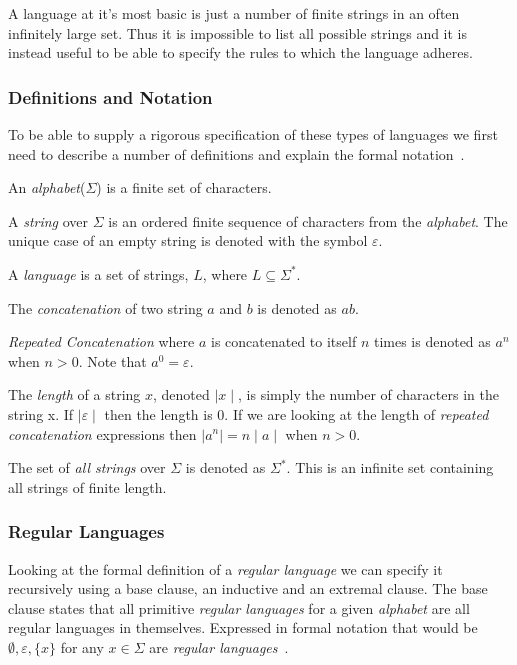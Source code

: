 \documentclass{sigchi}
\begin{document}
A language at it's most basic is just a number of finite strings in an often infinitely large set. Thus it is impossible to list all possible strings and it is instead useful to be able to specify the rules to which the language adheres. 

\subsubsection{Definitions and Notation}
To be able to supply a rigorous specification of these types of languages we first need to describe a number of definitions and explain the formal notation~\cite{Kozen:1997}.

An \emph{alphabet}($ \Sigma $) is a finite set of characters.

A \emph{string} over $\Sigma$ is an ordered finite sequence of characters from the \emph{alphabet}. The unique case of an empty string is denoted with the symbol $\varepsilon$.

A \emph{language} is a set of strings, $L$, where $L\subseteq\Sigma^*$.

The \emph{concatenation} of two string $a$ and $b$ is denoted as $ab$.

\emph{Repeated Concatenation} where $a$ is concatenated to itself $n$ times is denoted as $a^n$ when $n>0$. Note that $a^0 = \varepsilon$.

The \emph{length} of a string $x$, denoted $\mid x \mid$, is simply the number of characters in the string x. If $\mid\varepsilon\mid$ then the length is 0. If we are looking at the length of \emph{repeated concatenation} expressions then $\mid a^n \mid = n\mid a \mid$ when $n>0$.

The set of \emph{all strings} over $\Sigma$ is denoted as $\Sigma^*$. This is an infinite set containing all strings of finite length.

\subsubsection{Regular Languages}
Looking at the formal definition of a \emph{regular language} we can specify it recursively using a base clause, an inductive and an extremal clause. The base clause states that all primitive \emph{regular languages} for a given \emph{alphabet} are all regular languages in themselves. Expressed in formal notation that would be $\emptyset, \varepsilon, \{x\}$ for any $ x \in \Sigma$ are \emph{regular languages}~\cite{Kozen:1997}.
\end{document}
